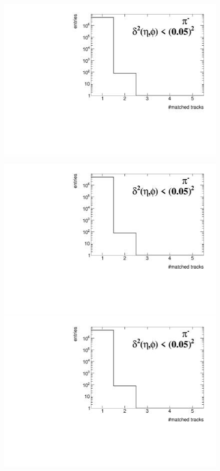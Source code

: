 \begin{figure}[ht]
{		\includegraphics[width=\linewidth,page=5]{graphics/eff/trackSplitting_QualityEtaPhiCD.pdf}\\
	}%
	\parbox{0.329\textwidth}{
		\centering
		\includegraphics[width=\linewidth,page=3]{graphics/eff/trackSplitting_QualityEtaPhiCD.pdf}\\
		\includegraphics[width=\linewidth,page=6]{graphics/eff/trackSplitting_QualityEtaPhiCD.pdf}\\
}
\end{figure}

